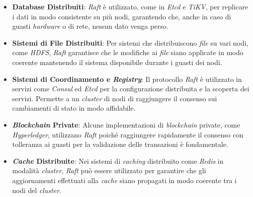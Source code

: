 \begin{itemize}
  \item \textbf{Database Distribuiti}: \textit{Raft} è utilizzato, come in \textit{Etcd} e \textit{TiKV}, per replicare i dati in modo consistente su più nodi, garantendo che, anche in caso di guasti \textit{hardware} o di rete, 
  nessun dato venga perso.

 \item \textbf{Sistemi di File Distribuiti}: Per sistemi che distribuiscono \textit{file} su vari nodi, come \textit{HDFS}, \textit{Raft} garantisce che le modifiche ai \textit{file} siano applicate in modo coerente mantenendo 
 il sistema disponibile durante i guasti dei nodi.

 \item \textbf{Sistemi di Coordinamento e \textit{Registry}}: Il protocollo \textit{Raft} è utilizzato in servizi come \textit{Consul} ed \textit{Etcd} per la configurazione distribuita e la scoperta dei servizi. Permette a un 
 \textit{cluster} di nodi di raggiungere il consenso sui cambiamenti di stato in modo affidabile.

 \item \textbf{\textit{Blockchain} Private}: Alcune implementazioni di \textit{blockchain} private, come \textit{Hyperledger}, utilizzano \textit{Raft} poiché raggiungere rapidamente il consenso con tolleranza ai guasti per 
 la validazione delle transazioni è fondamentale.

 \item \textbf{\textit{Cache} Distribuite}: Nei sistemi di \textit{caching} distribuito come \textit{Redis} in modalità \textit{cluster}, \textit{Raft} può essere utilizzato per garantire che gli aggiornamenti 
 effettuati alla \textit{cache} siano propagati in modo coerente tra i nodi del \textit{cluster}.
\end{itemize}

